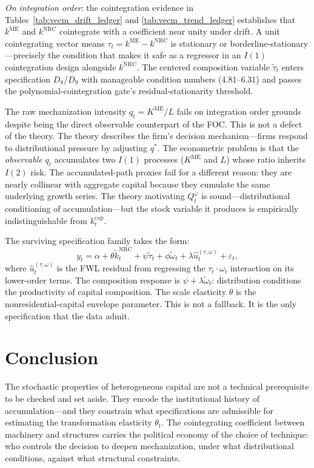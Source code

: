 \documentclass[11pt,a4paper]{article}
\begin{document}
\textit{On integration order}: the cointegration evidence in Tables~\ref{tab:vecm_drift_ledger} and \ref{tab:vecm_trend_ledger} establishes that $k^{\text{ME}}$ and $k^{\text{NRC}}$ cointegrate with a coefficient near unity under drift. A unit cointegrating vector means $\tau_t = k^{\text{ME}} - k^{\text{NRC}}$ is stationary or borderline-stationary---precisely the condition that makes it safe as a regressor in an $I(1)$ cointegration design alongside $k^{\text{NRC}}$. The centered composition variable $\tilde{\tau}_t$ enters specification $D_8$/$D_9$ with manageable condition numbers (4.81--6.31) and passes the polynomial-cointegration gate's residual-stationarity threshold.

The raw mechanization intensity $q_t = K^{\text{ME}}/L$ fails on integration order grounds despite being the direct observable counterpart of the FOC. This is not a defect of the theory. The theory describes the firm's decision mechanism---firms respond to distributional pressure by adjusting $q^*$. The econometric problem is that the \textit{observable} $q_t$ accumulates two $I(1)$ processes ($K^{\text{ME}}$ and $L$) whose ratio inherits $I(2)$ risk. The accumulated-path proxies fail for a different reason: they are nearly collinear with aggregate capital because they cumulate the same underlying growth series. The theory motivating $Q_t^\omega$ is sound---distributional conditioning of accumulation---but the stock variable it produces is empirically indistinguishable from $k_t^{\text{cap}}$.

The surviving specification family takes the form:
\begin{equation*}
y_t = \alpha + \theta \tilde{k}_t^{\text{NRC}} + \psi \tilde{\tau}_t + \phi \tilde{\omega}_t + \lambda \hat{u}_t^{(\tau, \omega)} + \varepsilon_t, \tag{$D_9$}
\end{equation*}
where $\hat{u}_t^{(\tau,\omega)}$ is the FWL residual from regressing the $\tau_t \cdot \omega_t$ interaction on its lower-order terms. The composition response is $\psi + \lambda \tilde{\omega}_t$: distribution conditions the productivity of capital composition. The scale elasticity $\theta$ is the nonresidential-capital envelope parameter. This is not a fallback. It is the only specification that the data admit.

\FloatBarrier
\section{Conclusion}

The stochastic properties of heterogeneous capital are not a technical prerequisite to be checked and set aside. They encode the institutional history of accumulation---and they constrain what specifications are admissible for estimating the transformation elasticity $\theta_t$. The cointegrating coefficient between machinery and structures carries the political economy of the choice of technique: who controls the decision to deepen mechanization, under what distributional conditions, against what structural constraints.
\end{document}
